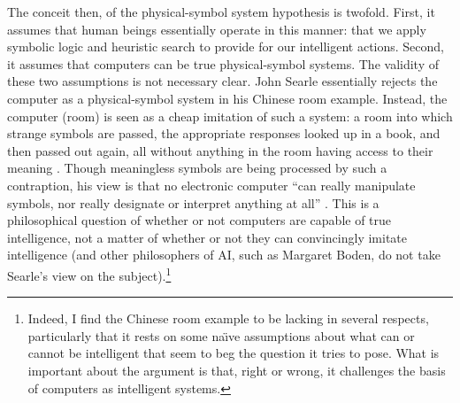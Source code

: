 The conceit then, of the physical-symbol system hypothesis is twofold.
First, it assumes that
human beings essentially operate in this manner: that we apply
symbolic logic and heuristic search to provide for our intelligent
actions. Second, it assumes that computers can be true physical-symbol
systems. The validity of these two assumptions is not necessary clear. John Searle
essentially rejects the computer as a physical-symbol system in his
Chinese room example. Instead, the computer (room) is seen as a cheap
imitation of such a system: a room into which strange symbols are
passed, the appropriate responses looked up in a book,
and then passed out again, all without anything in the room having
access to their meaning \cite{chineseSearle}. Though meaningless
symbols are being processed by such a contraption, his view is that no
electronic computer ``can really manipulate symbols, nor really
designate or interpret anything at all'' \cite{escapingBoden}. This is
a philosophical question of whether or not computers are capable of
true intelligence, not a matter of whether or not they can
convincingly imitate intelligence (and other philosophers of AI, such
as Margaret Boden, do not take Searle's view on the
subject).\footnote{Indeed, I find the Chinese room example to be
  lacking in several respects, particularly that it rests on some
  na\"{\i}ve assumptions about what can or cannot be intelligent that seem to beg
  the question it tries to pose. What is important about the
  argument is that, right or wrong, it challenges the basis of
  computers as intelligent systems.}

